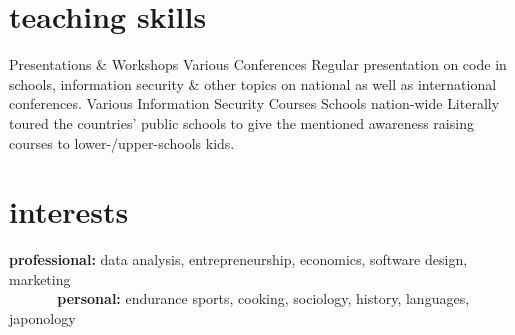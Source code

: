 \documentclass[a4paper]{friggeri-cv} %
\begin{document}

\section{teaching skills}

\begin{entrylist}
{Presentations \& Workshops}
{Various Conferences}
{Regular presentation on code in schools, information security \& other topics on national as well as international conferences.}
{Various Information Security Courses}
{Schools nation-wide}
{Literally toured the countries' public schools to give the mentioned awareness raising courses to lower-/upper-schools kids.}
\end{entrylist}


\section{interests}

\textbf{professional:} data analysis, entrepreneurship, economics, software design, marketing \\
\textbf{\ \ \ \ \ \ personal:} endurance sports, cooking, sociology, history, languages, japonology




\end{document}
